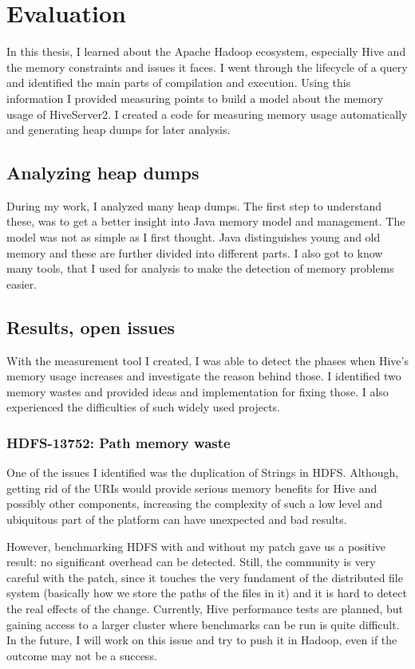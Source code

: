\chapter{Evaluation}
In this thesis, I learned about the Apache Hadoop ecosystem, especially Hive and the memory constraints and issues it faces. I went through the lifecycle of a query and identified the main parts of compilation and execution. Using this information I provided measuring points to build a model about the memory usage of HiveServer2. I created a code for measuring memory usage automatically and generating heap dumps for later analysis.

\section{Analyzing heap dumps}
During my work, I analyzed many heap dumps. The first step to understand these, was to get a better insight into Java memory model and management. The model was not as simple as I first thought. Java distinguishes young and old memory and these are further divided into different parts. I also got to know many tools, that I used for analysis to make the detection of memory problems easier. 

\section{Results, open issues}
With the measurement tool I created, I was able to detect the phases when Hive's memory usage increases and investigate the reason behind those. I identified two memory wastes and provided ideas and implementation for fixing those. I also experienced the difficulties of such widely used projects.

\subsection{HDFS-13752: Path memory waste}
One of the issues I identified was the duplication of Strings in HDFS. Although, getting rid of the URIs would provide serious memory benefits for Hive and possibly other components, increasing the complexity of such a low level and ubiquitous part of the platform can have unexpected and bad results. 

However, benchmarking HDFS with and without my patch gave us a positive result: no significant overhead can be detected. Still, the community is very careful with the patch, since it touches the very fundament of the distributed file system (basically how we store the paths of the files in it) and it is hard to detect the real effects of the change. Currently, Hive performance tests are planned, but gaining access to a larger cluster where benchmarks can be run is quite difficult. In the future, I will work on this issue and try to push it in Hadoop, even if the outcome may not be a success.

